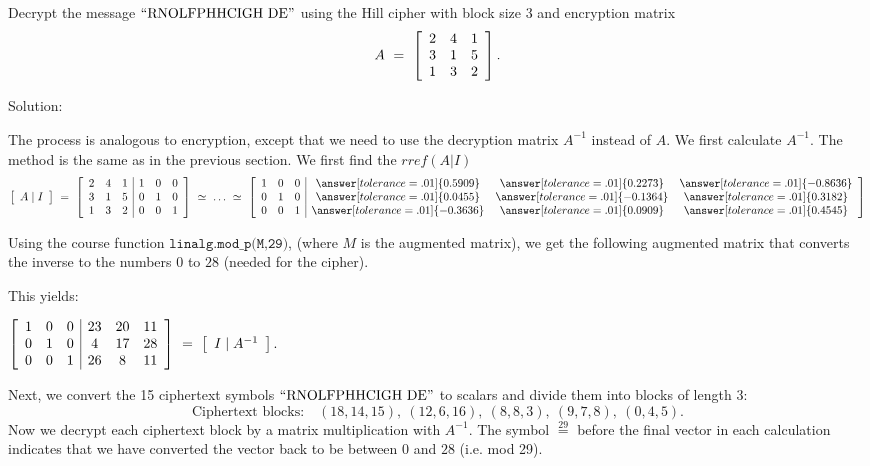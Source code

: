 \documentclass{ximera}
\begin{document}
\begin{example}\label{ex:hill-cipher-decryption}

  Decrypt the message $\q{RNOLFPHHCIGH DE}$ using the Hill cipher with
  block size $3$ and encryption matrix
  \begin{equation*}
    A ~=~ \startmat{ccc}
      2 & 4 & 1 \\
      3 & 1 & 5 \\
      1 & 3 & 2 \\
    \stopmat.
  \end{equation*}

  Solution:

  The process is analogous to encryption, except that we need to use
  the decryption matrix $A^{-1}$ instead of $A$. We first calculate
  $A^{-1}$.
  The method is the same as in the previous section. We first find the $rref(A|I)$
  \begin{equation*}
    \startmat{c}A\mid I\stopmat
    ~=~
    \startmat{ccc|ccc}
      2 & 4 & 1  &  1 & 0 & 0 \\
      3 & 1 & 5  &  0 & 1 & 0 \\
      1 & 3 & 2  &  0 & 0 & 1 \\
    \stopmat
    ~\simeq~\ldots~\simeq~
    \startmat{ccc|ccc}
    1 & 0 & 0  & \answer[tolerance=.01]{0.5909} & \answer[tolerance=.01]{0.2273} & \answer[tolerance=.01]{-0.8636} \\
    0 & 1 & 0  &   \answer[tolerance=.01]{0.0455} & \answer[tolerance=.01]{-0.1364} & \answer[tolerance=.01]{0.3182} \\
    0 & 0 & 1 & \answer[tolerance=.01]{-0.3636} & \answer[tolerance=.01]{0.0909} & \answer[tolerance=.01]{0.4545}
    \stopmat
  \end{equation*}

  Using the course function $\texttt{linalg.mod\_p(M,29)}$, (where $M$ is the augmented matrix), we get the following augmented matrix that converts the inverse to the numbers $0$ to $28$ (needed for the cipher).

  This yields:

  $\startmat{ccc|ccc}
      1 & 0 & 0  &  23 & 20 & 11 \\
      0 & 1 & 0  &   4 & 17 & 28 \\
      0 & 0 & 1  &  26 &  8 & 11 \\
    \stopmat
    ~=~
    \startmat{c}I\mid A^{-1}\stopmat.$

  Next, we convert the 15 ciphertext symbols $\q{RNOLFPHHCIGH DE}$ to
  scalars and divide them into blocks of length 3:
  \begin{equation*}
    \mbox{Ciphertext blocks:}\quad
    (18,14,15),\
    (12,6,16),\
    (8,8,3),\
    (9,7,8),\
    (0,4,5).
  \end{equation*}
  Now we decrypt each ciphertext block by a matrix multiplication
  with $A^{-1}$. The symbol $\stackrel{29}{=}$ before the final vector in each calculation indicates that we have converted the vector back to be between $0$ and $28$ (i.e. mod 29).


\end{example}
\end{document}
